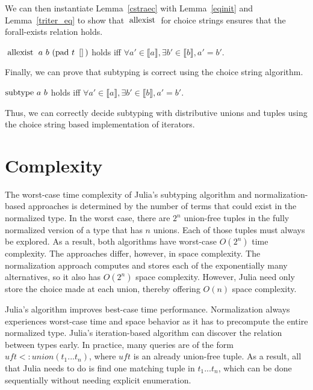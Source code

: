 \documentclass[a4paper,english]{lipics-v2019}
\newcommand{\denotes}[1]{\llbracket #1 \rrbracket}
\renewcommand{\c}[1]{\ensuremath{\text{\lstinline{#1}}}\xspace}
\begin{document}
\noindent We can then instantiate Lemma~\ref{cstraec} with
Lemma~\ref{eqinit} and Lemma~\ref{triter_eq} to show that \c{allexist} for
choice strings ensures that the forall-exists relation holds.
 
\begin{theorem}
$\c{allexist}~a~b~(\c{pad}~t~\c{[]})$
 holds iff $\forall a'\in\denotes{a},\exists b'\in\denotes{b}, a'=b'$.
\end{theorem}

\noindent Finally, we can prove that subtyping is correct using the choice
string algorithm.

\begin{theorem}
$\c{subtype}~a~b$ holds iff $\forall a'\in\denotes{a}, \exists
  b'\in\denotes{b}, a'=b'$.
\end{theorem}

\noindent
Thus, we can correctly decide subtyping with distributive unions and tuples
using the choice string based implementation of iterators.

\section{Complexity}

The worst-case time complexity of Julia's subtyping algorithm and
normalization-based approaches is determined by the number of terms that
could exist in the normalized type. In the worst case, there are $2^n$
union-free tuples in the fully normalized version of a type that has $n$
unions.  Each of those tuples must always be explored. As a result, both
algorithms have worst-case $O(2^n)$ time complexity. The approaches differ,
however, in space complexity. The normalization approach computes and stores
each of the exponentially many alternatives, so it also has $O(2^n)$ space
complexity. However, Julia need only store the choice made at each union,
thereby offering $O(n)$ space complexity.

Julia's algorithm improves best-case time performance.  Normalization always
experiences worst-case time and space behavior as it has to precompute the
entire normalized type. Julia's iteration-based algorithm can discover the
relation between types early. In practice, many queries are of the form
$\mathit{uft} <: union(t_1...t_n)$, where $\mathit{uft}$ is an already
union-free tuple. As a result, all that Julia needs to do is find one matching
tuple in $t_1 ... t_n$, which can be done sequentially without needing explicit
enumeration.
\end{document}
